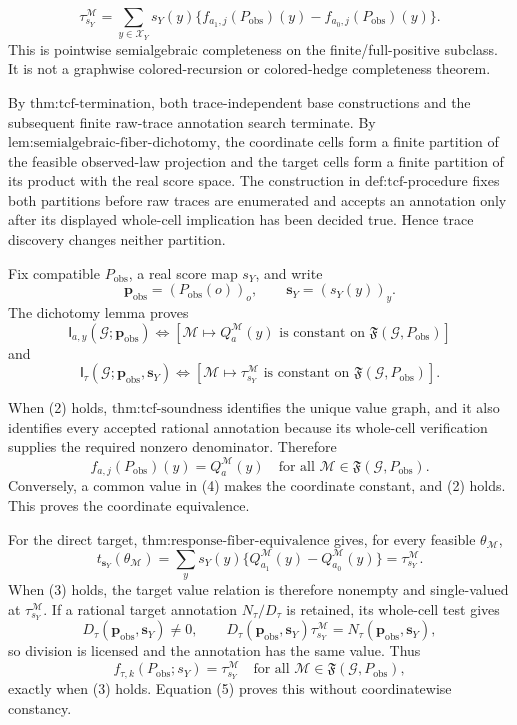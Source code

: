 \[
\tau_{s_Y}^{\mathcal M}
=\sum_{y\in\mathcal X_Y}s_Y(y)
\{f_{a_1,j}(P_{\mathrm{obs}})(y)-f_{a_0,j}(P_{\mathrm{obs}})(y)\}.
\]
This is pointwise semialgebraic completeness on the finite/full-positive subclass. It is not a graphwise colored-recursion or colored-hedge completeness theorem.

By \(\text{thm:tcf-termination}\), both trace-independent base constructions and the subsequent finite raw-trace annotation search terminate. By \(\text{lem:semialgebraic-fiber-dichotomy}\), the coordinate cells form a finite partition of the feasible observed-law projection and the target cells form a finite partition of its product with the real score space. The construction in \(\text{def:tcf-procedure}\) fixes both partitions before raw traces are enumerated and accepts an annotation only after its displayed whole-cell implication has been decided true. Hence trace discovery changes neither partition.

Fix compatible \(P_{\mathrm{obs}}\), a real score map \(s_Y\), and write
\[
\mathbf p_{\mathrm{obs}}=(P_{\mathrm{obs}}(o))_o,
\qquad
\mathbf s_Y=(s_Y(y))_y.
\tag{1}
\]
The dichotomy lemma proves
\[
\mathsf I_{a,y}(\mathcal G;\mathbf p_{\mathrm{obs}})
\Longleftrightarrow
\left[\mathcal M\mapsto Q_a^{\mathcal M}(y)
\text{ is constant on }\mathfrak F(\mathcal G,P_{\mathrm{obs}})\right]
\tag{2}
\]
and
\[
\mathsf I_{\tau}(\mathcal G;\mathbf p_{\mathrm{obs}},\mathbf s_Y)
\Longleftrightarrow
\left[\mathcal M\mapsto\tau_{s_Y}^{\mathcal M}
\text{ is constant on }\mathfrak F(\mathcal G,P_{\mathrm{obs}})\right].
\tag{3}
\]

When (2) holds, \(\text{thm:tcf-soundness}\) identifies the unique value graph, and it also identifies every accepted rational annotation because its whole-cell verification supplies the required nonzero denominator. Therefore
\[
f_{a,j}(P_{\mathrm{obs}})(y)=Q_a^{\mathcal M}(y)
\quad\text{for all }\mathcal M\in\mathfrak F(\mathcal G,P_{\mathrm{obs}}).
\tag{4}
\]
Conversely, a common value in (4) makes the coordinate constant, and (2) holds. This proves the coordinate equivalence.

For the direct target, \(\text{thm:response-fiber-equivalence}\) gives, for every feasible \(\theta_{\mathcal M}\),
\[
t_{\mathbf s_Y}(\theta_{\mathcal M})
=\sum_y s_Y(y)\{Q_{a_1}^{\mathcal M}(y)-Q_{a_0}^{\mathcal M}(y)\}
=\tau_{s_Y}^{\mathcal M}.
\tag{5}
\]
When (3) holds, the target value relation is therefore nonempty and single-valued at \(\tau_{s_Y}^{\mathcal M}\). If a rational target annotation \(N_{\tau}/D_{\tau}\) is retained, its whole-cell test gives
\[
D_{\tau}(\mathbf p_{\mathrm{obs}},\mathbf s_Y)\ne0,
\qquad
D_{\tau}(\mathbf p_{\mathrm{obs}},\mathbf s_Y)\tau_{s_Y}^{\mathcal M}
=N_{\tau}(\mathbf p_{\mathrm{obs}},\mathbf s_Y),
\tag{6}
\]
so division is licensed and the annotation has the same value. Thus
\[
f_{\tau,k}(P_{\mathrm{obs}};s_Y)=\tau_{s_Y}^{\mathcal M}
\quad\text{for all }\mathcal M\in\mathfrak F(\mathcal G,P_{\mathrm{obs}}),
\tag{7}
\]
exactly when (3) holds. Equation (5) proves this without coordinatewise constancy.

